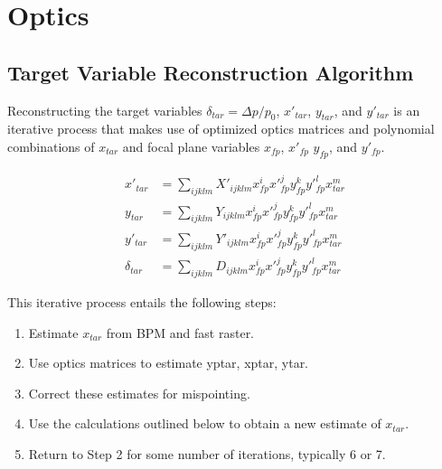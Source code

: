 \section{Optics} \label{sec:optics}

\subsection{Target Variable Reconstruction Algorithm}
Reconstructing the target variables
$\delta_{tar}=\Delta p/p_0$, $x'_{tar}$, $y_{tar}$, and $y'_{tar}$
is an iterative process that makes use of optimized optics matrices
and polynomial combinations of $x_{tar}$ and focal plane variables
$x_{fp}$, $x'_{fp}$ $y_{fp}$, and $y'_{fp}$.

\begin{align} \label{eqn:optics_reconstruction}
    x'_{tar}     &= \sum_{ijklm} X'_{ijklm} x^i_{fp} x'^j_{fp} y^k_{fp} y'^l_{fp} x^m_{tar} \\
    y_{tar}      &= \sum_{ijklm} Y_{ijklm}  x^i_{fp} x'^j_{fp} y^k_{fp} y'^l_{fp} x^m_{tar} \\
    y'_{tar}     &= \sum_{ijklm} Y'_{ijklm} x^i_{fp} x'^j_{fp} y^k_{fp} y'^l_{fp} x^m_{tar} \\
    \delta_{tar} &= \sum_{ijklm} D_{ijklm}  x^i_{fp} x'^j_{fp} y^k_{fp} y'^l_{fp} x^m_{tar}
\end{align}

This iterative process entails the following steps:
\begin{enumerate}
    \item Estimate $x_{tar}$ from BPM and fast raster.
    \item Use optics matrices to estimate yptar, xptar, ytar.
    \item Correct these estimates for mispointing.
    \item Use the calculations outlined below to obtain a new estimate of $x_{tar}$.
    \item Return to Step 2 for some number of iterations, typically 6 or 7.
\end{enumerate}


